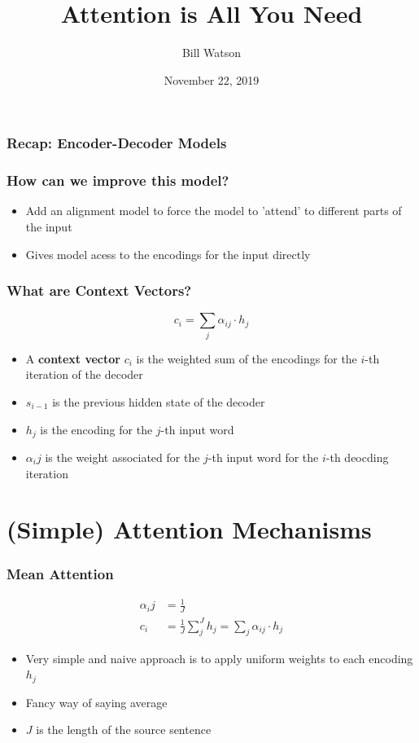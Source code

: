 \documentclass{beamer}
\title{Attention is All You Need}
\author{Bill Watson}
\institute{S\&P Global}
\date{November 22, 2019}
\begin{document}
\begin{frame}
\titlepage
\end{frame}


\begin{frame}
\frametitle{Recap: Encoder-Decoder Models}

\end{frame}

\begin{frame}
\frametitle{How can we improve this model?}
\begin{itemize}
  \item Add an alignment model to force the model to 'attend' to different parts of the input
  \item Gives model acess to the encodings for the input directly
\end{itemize}
\end{frame}

\begin{frame}
\frametitle{What are Context Vectors?}
\begin{equation*}
  c_i = \sum_{j} \alpha_{ij} \cdot h_j
\end{equation*}
\begin{itemize}
  \item A \textbf{context vector} $c_i$ is the weighted sum of the encodings for the $i$-th iteration of the decoder
  \item $s_{i-1}$ is the previous hidden state of the decoder
  \item $h_j$ is the encoding for the $j$-th input word
  \item $\alpha_ij$ is the weight associated for the $j$-th input word for the $i$-th deocding iteration
\end{itemize}
\end{frame}

\section{(Simple) Attention Mechanisms}

\begin{frame}
\frametitle{Mean Attention}
\begin{equation*}
  \begin{split}
  \alpha_ij &= \frac{1}{J} \\
  c_i &= \frac{1}{J} \sum_j^J h_j = \sum_{j} \alpha_{ij} \cdot h_j
  \end{split}
\end{equation*}
\begin{itemize}
  \item Very simple and naive approach is to apply uniform weights to each encoding $h_j$
  \item Fancy way of saying average
  \item $J$ is the length of the source sentence
\end{itemize}
\end{frame}
\end{document}
